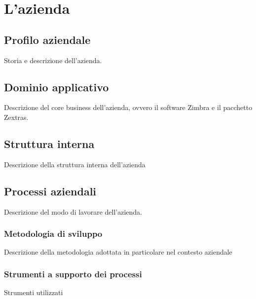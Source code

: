 
\chapter{L'azienda}
\label{cap:azienda}

\section{Profilo aziendale}
Storia e descrizione dell'azienda.

\section{Dominio applicativo}
Descrizione del core business dell'azienda, ovvero il software Zimbra e il pacchetto Zextras.

\section{Struttura interna}
Descrizione della struttura interna dell'azienda

\section{Processi aziendali}
Descrizione del modo di lavorare dell'azienda.

\subsection{Metodologia di sviluppo}
Descrizione della metodologia adottata in particolare nel contesto aziendale

\subsection{Strumenti a supporto dei processi}
Strumenti utilizzati 

